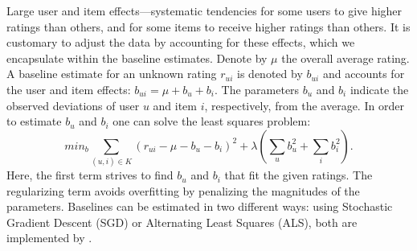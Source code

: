 Large user and item effects—systematic tendencies for some users to give higher ratings than others, and for some items to receive higher ratings than others. It is customary to adjust the data by accounting for
these effects, which we encapsulate within the baseline estimates. Denote by $\mu$ the overall average rating. A baseline estimate for an unknown rating $r_{ui}$ is denoted by $b_{ui}$ and accounts for the user and item effects: $b_{ui} = \mu + b_u + b_i$. The parameters $b_u$ and $b_i$ indicate the observed deviations of user $u$ and item $i$, respectively, from the average. In order to estimate $b_u$ and $b_i$ one can solve
the least squares problem: 
\begin{equation}
  min_{b} \sum_{(u,i)\in K} (r_{ui}-\mu-b_u-b_i)^2+\lambda(\sum_u b_u^2 +\sum_i
  b_i^2).
  \label{eq:sgd}
\end{equation}
 Here, the first term strives to find $b_u$ and $b_i$ that fit the given
 ratings. The regularizing term avoids overfitting by penalizing the magnitudes
 of the parameters. Baselines can be estimated in two different ways: using
 Stochastic Gradient Descent (SGD) or Alternating Least Squares (ALS), both are
 implemented by \cite{surprise}.
